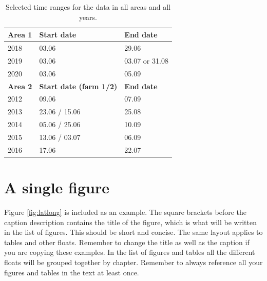 \begin{table}[ht!]
\centering
    \begin{tabular}{ m{3cm} m{5cm} m{3cm} } 
    \toprule
    \toprule
    \textbf{Area 1} & \textbf{Start date} & \textbf{End date} \\
    \midrule
    2018    & 03.06    & 29.06                       \\[1.3ex]
    2019    & 03.06    & 03.07 or 31.08\footnotemark \\[1.3ex]
    2020    & 03.06    & 05.09                       \\[1.3ex]
    \midrule
    \textbf{Area 2} & \textbf{Start date (farm 1/2)} & \textbf{End date} \\
    \midrule
    2012    & 09.06            & 07.09               \\[1.3ex]
    2013    & 23.06 / 15.06    & 25.08               \\[1.3ex]
    2014    & 05.06 / 25.06    & 10.09               \\[1.3ex]
    2015    & 13.06 / 03.07    & 06.09               \\[1.3ex]
    2016    & 17.06            & 22.07               \\[1.3ex]
    \bottomrule
    \bottomrule
    \end{tabular}
\caption[Selected time ranges for all data]{Selected time ranges for the data in all areas and all years.}
\label{table:time_ranges}
\end{table}




\section{A single figure}

Figure \ref{fig:latlong} is included as an example. The square brackets before the caption description contains the title of the figure, which is what will be written in the list of figures. This should be short and concise. The same layout applies to tables and other floats. Remember to change the title as well as the caption if you are copying these examples. In the list of figures and tables all the different floats will be grouped together by chapter. Remember to always reference all your figures and tables in the text at least once.

